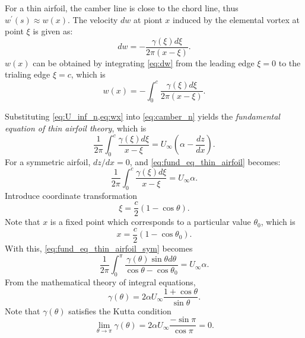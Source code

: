 For a thin airfoil, the camber line is close to the chord line, thus $w^\prime(s)\approx w(x)$. The velocity $dw$ at piont $x$ induced by the elemental vortex at point $\xi$ is given as:
\begin{equation}
	dw = -\frac{\gamma(\xi)d\xi}{2\pi(x-\xi)}.
	\label{eq:dw}
\end{equation}
$w(x)$ can be obtained by integrating \cref{eq:dw} from the leading edge $\xi=0$ to the trialing edge $\xi=c$, which is
\begin{equation}
	w(x) = -\int_0^c\frac{\gamma(\xi)d\xi}{2\pi(x-\xi)}. \label{eq:wx}
\end{equation}

Substituting \cref{eq:U_inf_n,eq:wx} into \cref{eq:camber_n} yields the \emph{fundamental equation of thin airfoil theory}, which is
\begin{equation}
	\frac{1}{2\pi}\int_0^c\frac{\gamma(\xi)d\xi}{x-\xi}=U_\infty\left(\alpha-\frac{dz}{dx}\right). \label{eq:fund_eq_thin_airfoil}
\end{equation}
For a symmetric airfoil, $dz/dx=0$, and \cref{eq:fund_eq_thin_airfoil} becomes:
\begin{equation}
	\frac{1}{2\pi}\int_0^c\frac{\gamma(\xi)d\xi}{x-\xi}=U_\infty\alpha. \label{eq:fund_eq_thin_airfoil_sym}
\end{equation}
Introduce coordinate transformation
\begin{equation}
	\xi = \frac{c}{2}(1 - \cos \theta).
\end{equation}
Note that $x$ is a fixed point which corresponds to a particular value $\theta_0$, which is
\begin{equation}
	x = \frac{c}{2}(1 - \cos \theta_0).
\end{equation}
With this, \cref{eq:fund_eq_thin_airfoil_sym} becomes
\begin{equation}
	\frac{1}{2\pi}\int_0^\pi\frac{\gamma(\theta)\sin \theta d\theta}{\cos \theta - \cos \theta_0}=U_\infty\alpha. \label{eq:fund_eq_thin_airfoil_sym2}
\end{equation}
From the mathematical theory of integral equations,
\begin{equation}
	\gamma(\theta) = 2 \alpha U_\infty \frac{1 + \cos \theta}{\sin \theta}.
\end{equation}
Note that $\gamma(\theta)$ satisfies the Kutta condition
\begin{equation}
	\lim_{\theta\rightarrow\pi}\gamma(\theta)=2 \alpha U_\infty \frac{-\sin \pi}{\cos \pi} = 0.
\end{equation}
